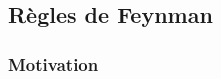 \documentclass[a4paper,11pt]{article}
\theoremstyle{plain}
\theoremstyle{definition}
\theoremstyle{remark}
\numberwithin{equation}{section}
\numberwithin{equation}{subsection}
\numberwithin{figure}{section}
\begin{document}
\subsection{Règles de Feynman}


\subsubsection{Motivation}
\end{document}

